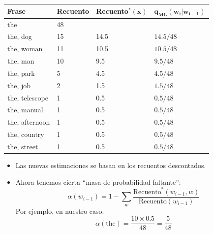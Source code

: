 \begin{table}[h]
    \centering
    \begin{tabular}{llll}
        \textbf{Frase} & \textbf{Recuento} & \textbf{Recuento}$\mathbf{^*(x)}$ & $\mathbf{q_{\text{ML}}(w_i | w_{i-1})}$ \\
        \hline
        the & 48 & & \\
        the, dog & 15 & 14.5 & $14.5/48$ \\
        the, woman & 11 & 10.5 & $10.5/48$ \\
        the, man & 10 & 9.5 & $9.5/48$ \\
        the, park & 5 & 4.5 & $4.5/48$ \\
        the, job & 2 & 1.5 & $1.5/48$ \\
        the, telescope & 1 & 0.5 & $0.5/48$ \\
        the, manual & 1 & 0.5 & $0.5/48$ \\
        the, afternoon & 1 & 0.5 & $0.5/48$ \\
        the, country & 1 & 0.5 & $0.5/48$ \\
        the, street & 1 & 0.5 & $0.5/48$ \\
    \end{tabular}
\end{table}

\begin{itemize}
    \item Las nuevas estimaciones se basan en los recuentos descontados.
    \item Ahora tenemos cierta ``masa de probabilidad faltante'':
    \[
    \alpha(w_{i-1}) = 1 - \sum_{w} \frac{{\text{{Recuento}}^*(w_{i-1}, w)}}{{\text{{Recuento}}(w_{i-1})}}
    \]
    Por ejemplo, en nuestro caso:
    \[
    \alpha(\text{{the}}) = \frac{{10 \times 0.5}}{{48}} = \frac{{5}}{{48}}
    \]
\end{itemize}


